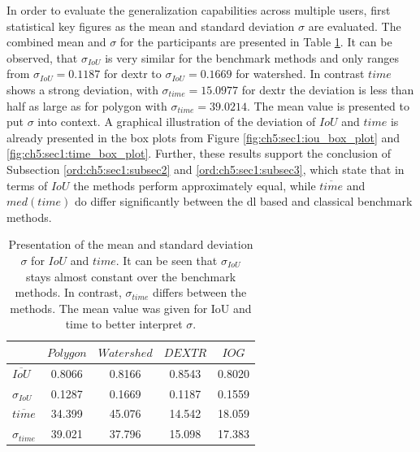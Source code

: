 In order to evaluate the generalization capabilities across multiple users, first statistical key figures as the mean and standard deviation $ \sigma $ are evaluated.
The combined mean and $ \sigma $ for the participants are presented in Table \ref{tab:ch5:all_benchmark_users_varaince}.
It can be observed, that $ \sigma_{IoU} $ is very similar for the benchmark methods and only ranges from $ \sigma_{IoU} = 0.1187 $ for \gls{dextr} to $ \sigma_{IoU} = 0.1669 $ for watershed.
In contrast $ time $ shows a strong deviation, with $ \sigma_{time} = 15.0977 $ for \gls{dextr} the deviation is less than half as large as for polygon with $ \sigma_{time} = 39.0214 $.
The mean value is presented to put $ \sigma $ into context.
A graphical illustration of the deviation of $ IoU $ and $ time $ is already presented in the box plots from Figure \ref{fig:ch5:sec1:iou_box_plot} and \ref{fig:ch5:sec1:time_box_plot}.
Further, these results support the conclusion of Subsection \ref{ord:ch5:sec1:subsec2} and \ref{ord:ch5:sec1:subsec3}, which state that in terms of $ IoU $ the methods perform approximately equal, while $ \overline{time} $ and $ med(time) $ do differ significantly between the \gls{dl} based and classical benchmark methods.
\begin{table}[h!]
	\centering
	\begin{tabular}{l|c c c c}
		\toprule 		
			 				& $ Polygon $  	& $ Watershed $ 	& $ DEXTR $ 	& $ IOG $	\\
		\midrule
		\rule{0pt}{3ex}%
		$ \overline{IoU} $	& 0.8066 		& 0.8166		 	& 0.8543		& 0.8020	\\
		\rule{0pt}{3ex}%
		$ \sigma_{IoU} $	& 0.1287 		& 0.1669		 	& 0.1187 		& 0.1559	\\
		\rule{0pt}{3ex}%
		$ \overline{time} $	& 34.399 		& 45.076			& 14.542 		& 18.059	\\
		\rule{0pt}{3ex}%
		$ \sigma_{time} $	& 39.021 		& 37.796			& 15.098 		& 17.383	\\
		\bottomrule
	\end{tabular}
	\caption[Mean and standard deviation of the benchmark methods]{
		Presentation of the mean and standard deviation $ \sigma $ for $ IoU $ and $ time $.
		It can be seen that $ \sigma_{IoU} $ stays almost constant over the benchmark methods.
		In contrast, $ \sigma_{time} $ differs between the methods.
		The mean value was given for IoU and time to better interpret $ \sigma $.
	}\label{tab:ch5:all_benchmark_users_varaince}	
\end{table}


